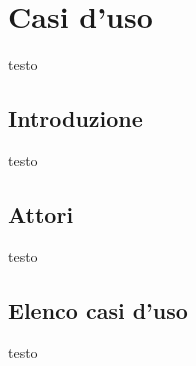 \section{Casi d'uso}
testo

	\subsection{Introduzione}
	testo
	
	\subsection{Attori}
	testo
	
	\subsection{Elenco casi d'uso}
	testo
